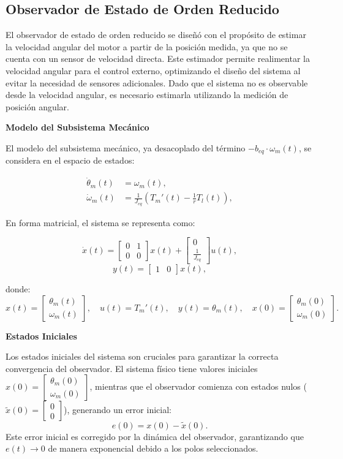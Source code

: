 \documentclass{article}
\begin{document}
\subsection{Observador de Estado de Orden Reducido}

El observador de estado de orden reducido se diseñó con el propósito de estimar la velocidad angular del motor a partir de la posición medida, ya que no se cuenta con un sensor de velocidad directa. Este estimador permite realimentar la velocidad angular para el control externo, optimizando el diseño del sistema al evitar la necesidad de sensores adicionales. Dado que el sistema no es observable desde la velocidad angular, es necesario estimarla utilizando la medición de posición angular.

\textbf{Modelo del Subsistema Mecánico}

El modelo del subsistema mecánico, ya desacoplado del término \(-b_{eq} \cdot \omega_m(t)\), se considera en el espacio de estados:

\[
\begin{aligned}
    \dot{\theta}_m(t) &= \omega_m(t), \\
    \dot{\omega}_m(t) &= \frac{1}{J_{eq}} \left(T_m'(t) - \frac{1}{r} T_l(t) \right),
\end{aligned}
\]

En forma matricial, el sistema se representa como:

\[
\dot{x}(t) = 
\begin{bmatrix}
0 & 1 \\ 
0 & 0
\end{bmatrix} 
x(t) + 
\begin{bmatrix}
0 \\ 
\frac{1}{J_{eq}}
\end{bmatrix} 
u(t),
\]
\[
y(t) = 
\begin{bmatrix}
1 & 0
\end{bmatrix} 
x(t),
\]

donde:
\[
x(t) = 
\begin{bmatrix}
\theta_m(t) \\ 
\omega_m(t)
\end{bmatrix}, \quad
u(t) = T_m'(t), \quad
y(t) = \theta_m(t), \quad
x(0) = 
\begin{bmatrix}
\theta_m(0) \\ 
\omega_m(0)
\end{bmatrix}.
\]


\textbf{Estados Iniciales}

Los estados iniciales del sistema son cruciales para garantizar la correcta convergencia del observador. El sistema físico tiene valores iniciales \(x(0) = \begin{bmatrix} \theta_m(0) \\ \omega_m(0) \end{bmatrix}\), mientras que el observador comienza con estados nulos (\(\tilde{x}(0) = \begin{bmatrix} 0 \\ 0 \end{bmatrix}\)), generando un error inicial:
\[
e(0) = x(0) - \tilde{x}(0).
\]
Este error inicial es corregido por la dinámica del observador, garantizando que \(e(t) \to 0\) de manera exponencial debido a los polos seleccionados.
\end{document}

